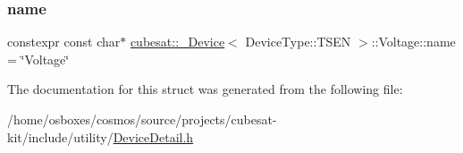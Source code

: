 \subsubsection{\texorpdfstring{name}{name}}
{\footnotesize\ttfamily constexpr const char$\ast$ \hyperlink{structcubesat_1_1__Device}{cubesat\+::\+\_\+\+Device}$<$ Device\+Type\+::\+T\+S\+EN $>$\+::Voltage\+::name = \char`\"{}Voltage\char`\"{}\hspace{0.3cm}{\ttfamily [static]}}



The documentation for this struct was generated from the following file\+:\begin{DoxyCompactItemize}
\item 
/home/osboxes/cosmos/source/projects/cubesat-\/kit/include/utility/\hyperlink{DeviceDetail_8h}{Device\+Detail.\+h}\end{DoxyCompactItemize}

